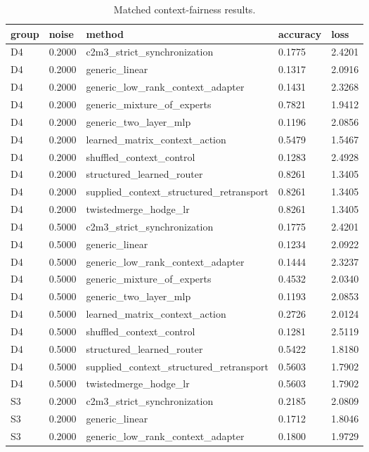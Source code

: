 \begin{table}[t]
\centering
\caption{Matched context-fairness results.}
\begin{tabular}{lllll}
\toprule
group & noise & method & accuracy & loss \\
\midrule
D4 & 0.2000 & c2m3\_strict\_synchronization & 0.1775 & 2.4201 \\
D4 & 0.2000 & generic\_linear & 0.1317 & 2.0916 \\
D4 & 0.2000 & generic\_low\_rank\_context\_adapter & 0.1431 & 2.3268 \\
D4 & 0.2000 & generic\_mixture\_of\_experts & 0.7821 & 1.9412 \\
D4 & 0.2000 & generic\_two\_layer\_mlp & 0.1196 & 2.0856 \\
D4 & 0.2000 & learned\_matrix\_context\_action & 0.5479 & 1.5467 \\
D4 & 0.2000 & shuffled\_context\_control & 0.1283 & 2.4928 \\
D4 & 0.2000 & structured\_learned\_router & 0.8261 & 1.3405 \\
D4 & 0.2000 & supplied\_context\_structured\_retransport & 0.8261 & 1.3405 \\
D4 & 0.2000 & twistedmerge\_hodge\_lr & 0.8261 & 1.3405 \\
D4 & 0.5000 & c2m3\_strict\_synchronization & 0.1775 & 2.4201 \\
D4 & 0.5000 & generic\_linear & 0.1234 & 2.0922 \\
D4 & 0.5000 & generic\_low\_rank\_context\_adapter & 0.1444 & 2.3237 \\
D4 & 0.5000 & generic\_mixture\_of\_experts & 0.4532 & 2.0340 \\
D4 & 0.5000 & generic\_two\_layer\_mlp & 0.1193 & 2.0853 \\
D4 & 0.5000 & learned\_matrix\_context\_action & 0.2726 & 2.0124 \\
D4 & 0.5000 & shuffled\_context\_control & 0.1281 & 2.5119 \\
D4 & 0.5000 & structured\_learned\_router & 0.5422 & 1.8180 \\
D4 & 0.5000 & supplied\_context\_structured\_retransport & 0.5603 & 1.7902 \\
D4 & 0.5000 & twistedmerge\_hodge\_lr & 0.5603 & 1.7902 \\
S3 & 0.2000 & c2m3\_strict\_synchronization & 0.2185 & 2.0809 \\
S3 & 0.2000 & generic\_linear & 0.1712 & 1.8046 \\
S3 & 0.2000 & generic\_low\_rank\_context\_adapter & 0.1800 & 1.9729 \\

\end{tabular}
\end{table}
